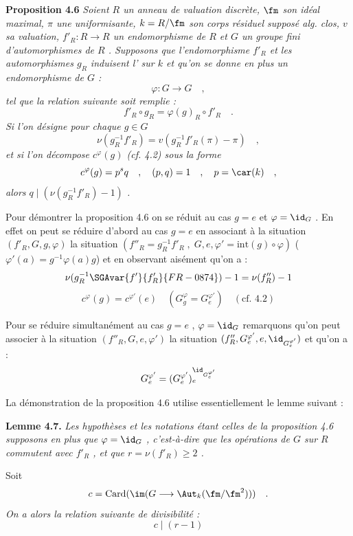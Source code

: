 \medskip
\noindent
\textbf{Proposition 4.6} \emph{Soient $R$ un anneau de valuation discrète, $\fm$ son idéal maximal, $\pi$ une uniformisante, $k = R/\fm$ son corps résiduel supposé alg. clos, $v$ sa valuation, $f'_R : R \to R$ un endomorphisme de $R$ et $G$ un groupe fini d'automorphismes de $R$ . Supposons que l'endomorphisme $f'_R$ et les automorphismes $g_R$ induisent l' sur $k$ et qu'on se donne en plus un endomorphisme de $G$ :
\[
\varphi : G \longrightarrow G \quad ,
\]
tel que la relation suivante soit remplie :
\[
f'_R \circ g_R = \varphi(g)_R \circ f'_R \quad .
\]
Si l'on désigne pour chaque $g \in G$
\[
\nu(g_R^{-1}f'_R) = v(g_R^{-1}f'_R(\pi) - \pi) \quad ,
\]
et si l'on décompose $c^\varphi(g)$ (cf. 4.2) sous la forme
\[
c^\varphi(g) = p^s q \quad , \quad (p,q) = 1 \quad , \quad p = \car(k) \quad ,
\]
alors $q \mid (\nu(g_R^{-1}f'_R) - 1)$ .}

\medskip

Pour démontrer la proposition 4.6 on se réduit au cas $g = e$ et $\varphi = \id_G$ . En effet on peut se réduire d'abord au cas $g = e$ en associant à la situation $(f'_R, G, g, \varphi)$ la situation $(f''_R = g_R^{-1}f'_R \; , \; G, e, \varphi' = \mathrm{int}(g) \circ \varphi)$ ($\varphi'(a) = g^{-1}\varphi(a)g$) et en observant aisément qu'on a :
\[
\nu(g_R^{-1}\SGAvar{f'}{f'_R}{FR-0874}) - 1 = \nu(f''_R) - 1
\]
\[
c^\varphi(g) = c^{\varphi'}(e) \quad (G_g^\varphi = G_e^{\varphi'}) \quad (\text{cf. 4.2})
\]

Pour se réduire simultanément au cas $g = e$ , $\varphi = \id_G$ remarquons qu'on peut associer à la situation $(f''_R, G, e, \varphi')$ la situation $(f''_R, G_e^{\varphi'}, e, \id_{G_e^{\varphi'}})$ et qu'on a :
\[
G_e^{\varphi'} = (G_e^{\varphi'})_e^{\id_{G_e^{\varphi'}}}
\]

La démonstration de la proposition 4.6 utilise essentiellement le lemme suivant :

\medskip
\noindent
\textbf{Lemme 4.7.} \emph{Les hypothèses et les notations étant celles de la proposition 4.6 supposons en plus que $\varphi = \id_G$ , c'est-à-dire que les opérations de $G$ sur $R$ commutent avec $f'_R$ , et que $r = \nu(f'_R) \geq 2$ .}

Soit
\emph{\[
c = \operatorname{Card}(\im(G \longrightarrow \Aut_k(\fm/\fm^2))) \quad .
\]
On a alors la relation suivante de divisibilité :
\[
c \mid (r - 1)
\]}

